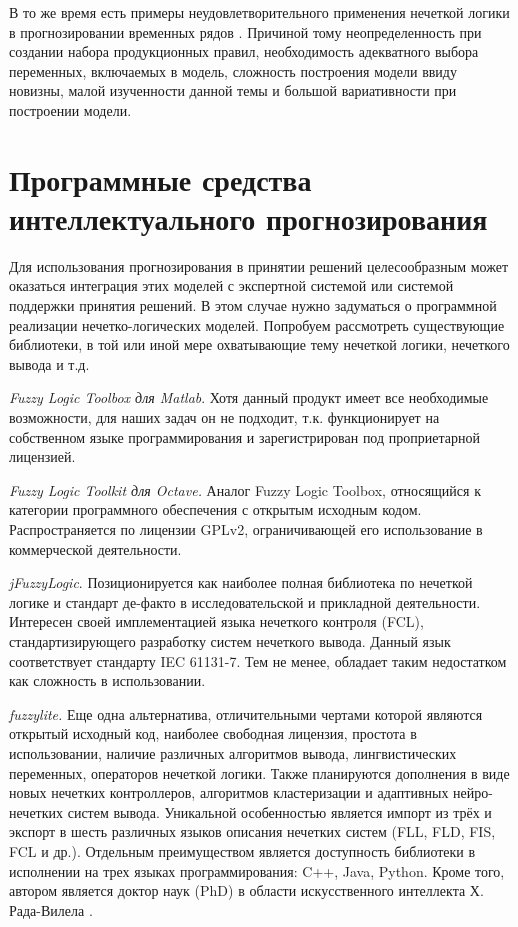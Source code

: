 В то же время есть примеры неудовлетворительного применения нечеткой логики в прогнозировании временных рядов \cite{Hoekstr2010}. 
Причиной тому неопределенность при создании набора продукционных правил, необходимость адекватного выбора переменных, 
включаемых в модель, сложность построения модели ввиду новизны, малой изученности данной темы и большой вариативности при построении модели.

\newpage
\section{Программные средства интеллектуального прогнозирования}

Для использования прогнозирования в принятии решений целесообразным может
оказаться интеграция этих моделей с экспертной системой или системой поддержки
принятия решений.  В этом случае нужно задуматься о программной реализации
нечетко-логических моделей.  Попробуем рассмотреть существующие библиотеки, в
той или иной мере охватывающие тему нечеткой логики, нечеткого вывода и т.д.

\textit{Fuzzy Logic Toolbox для Matlab}. Хотя данный продукт имеет все
необходимые возможности, для наших задач он не подходит, т.к. функционирует на
собственном языке программирования и зарегистрирован под проприетарной лицензией.

\textit{Fuzzy Logic Toolkit для Octave.} Аналог Fuzzy Logic Toolbox, относящийся
к категории программного обеспечения с открытым исходным кодом. Распространяется
по лицензии GPLv2, ограничивающей его использование в коммерческой деятельности.

\textit{jFuzzyLogic}. Позиционируется как наиболее полная библиотека по нечеткой
логике и стандарт де-факто в исследовательской и прикладной деятельности.
Интересен своей имплементацией языка нечеткого контроля (FCL),
стандартизирующего разработку систем нечеткого вывода. Данный язык соответствует
стандарту IEC 61131-7. Тем не менее, обладает таким недостатком как сложность в
использовании.

\textit{fuzzylite.} Еще одна альтернатива, отличительными чертами которой
являются открытый исходный код, наиболее свободная лицензия, простота в
использовании, наличие различных алгоритмов вывода, лингвистических переменных,
операторов нечеткой логики. Также планируются дополнения в виде новых нечетких
контроллеров, алгоритмов кластеризации и адаптивных нейро-нечетких систем
вывода. Уникальной особенностью является импорт из трёх и экспорт в шесть
различных языков описания нечетких систем (FLL, FLD, FIS, FCL и др.).  Отдельным
преимуществом является доступность библиотеки в исполнении на трех языках
программирования: C++, Java, Python. Кроме того, автором является доктор наук
(PhD) в области искусственного интеллекта Х. Рада-Вилела \cite{RadaVilela2014}.

